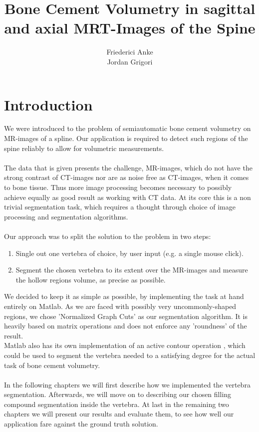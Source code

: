 \documentclass{article}
\title{Bone Cement Volumetry in sagittal and axial MRT-Images of the Spine}
\author{Friederici Anke\\ Jordan Grigori}
\begin{document}
  
  \begin{titlepage}
  	\centering
	
  \end{titlepage}
  
  \maketitle
  \thispagestyle{empty}
  \pagebreak
  
  \section{Introduction}
  \setcounter{page}{1}
  {
  	We were introduced to the problem of semiautomatic bone cement volumetry 
	on MR-images of a spline.
	Our application is required 
	to detect such regions of the spine reliably to allow for volumetric measurements.\\
	\\The data that is given presents the challenge, MR-images, which do not have
	the strong contrast of CT-images nor are as noise free as CT-images, when it
	comes to bone tissue. Thus more image processing becomes necessary to possibly 
	achieve equally as good result as working with CT data.
	At its core this is a non trivial segmentation task, which requires a thought 
	through choice of image processing and segmentation algorithms.\\
	\\Our approach was to split the solution to the problem in two steps:
	\begin{enumerate}
		\item Single out one vertebra of choice, by user input (e.g. a single mouse click).
		\item Segment the chosen vertebra to its extent over the MR-images and measure the hollow regions volume, as precise as possible.
	\end{enumerate}
	We decided to keep it as simple as possible, by implementing the task at hand 
	entirely on Matlab. 
	As we are faced with possibly very uncommonly-shaped regions, we chose 'Normalized Graph Cuts' \cite{[ShiMalik00]} as our segmentation algorithm.
	It is heavily based on matrix operations and does not enforce any 'roundness' of the result.
	\\Matlab also has its own implementation of an active contour
	operation \cite{[ChanVese01]}, which could be used to segment the vertebra needed to a satisfying degree for the actual task of bone cement volumetry.\\	
	\\In the following chapters we will first describe how we implemented the vertebra segmentation.
	Afterwards, we will move on to describing our chosen filling compound segmentation inside the vertebra.
	At last in the remaining two chapters we will present our results and evaluate them, to see how well our application fare against the ground truth solution.
  }
  \pagebreak
\end{document}
